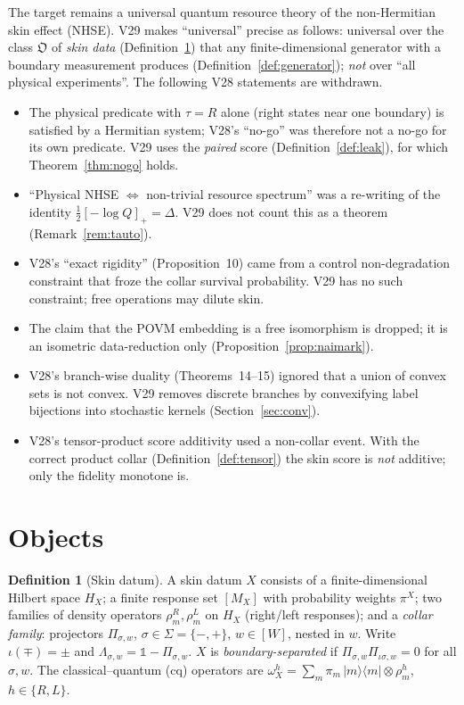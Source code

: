\documentclass[11pt]{article}
\theoremstyle{definition}
\newtheorem{definition}{Definition}
\theoremstyle{remark}
\newcommand{\one}{\mathbb{1}}
\begin{document}
The target remains a universal quantum resource theory of the non-Hermitian skin effect (NHSE). V29 makes ``universal'' precise as follows: universal over the class $\mathfrak{O}$ of \emph{skin data} (Definition~\ref{def:object}) that any finite-dimensional generator with a boundary measurement produces (Definition~\ref{def:generator}); \emph{not} over ``all physical experiments''. The following V28 statements are withdrawn.
\begin{itemize}
\item The physical predicate with $\tau=R$ alone (right states near one boundary) is satisfied by a Hermitian system; V28's ``no-go'' was therefore not a no-go for its own predicate. V29 uses the \emph{paired} score (Definition~\ref{def:leak}), for which Theorem~\ref{thm:nogo} holds.
\item ``Physical NHSE $\Leftrightarrow$ non-trivial resource spectrum'' was a re-writing of the identity $\tfrac12[-\log Q]_+=\Delta$. V29 does not count this as a theorem (Remark~\ref{rem:tauto}).
\item V28's ``exact rigidity'' (Proposition~10) came from a control non-degradation constraint that froze the collar survival probability. V29 has no such constraint; free operations may dilute skin.
\item The claim that the POVM embedding is a free isomorphism is dropped; it is an isometric data-reduction only (Proposition~\ref{prop:naimark}).
\item V28's branch-wise duality (Theorems~14--15) ignored that a union of convex sets is not convex. V29 removes discrete branches by convexifying label bijections into stochastic kernels (Section~\ref{sec:conv}).
\item V28's tensor-product score additivity used a non-collar event. With the correct product collar (Definition~\ref{def:tensor}) the skin score is \emph{not} additive; only the fidelity monotone is.
\end{itemize}

\section{Objects}
\label{sec:objects}

\begin{definition}[Skin datum]\label{def:object}
A skin datum $X$ consists of a finite-dimensional Hilbert space $H_X$; a finite response set $[M_X]$ with probability weights $\pi^X$; two families of density operators $\rho^R_m,\rho^L_m$ on $H_X$ (right/left responses); and a \emph{collar family}: projectors $\Pi_{\sigma,w}$, $\sigma\in\Sigma=\{-,+\}$, $w\in[W]$, nested in $w$. Write $\iota(\mp)=\pm$ and $\Lambda_{\sigma,w}=\one-\Pi_{\sigma,w}$. $X$ is \emph{boundary-separated} if $\Pi_{\sigma,w}\Pi_{\iota\sigma,w}=0$ for all $\sigma,w$.
The classical--quantum (cq) operators are $\omega^h_X=\sum_m\pi_m\,|m\rangle\!\langle m|\otimes\rho^h_m$, $h\in\{R,L\}$.
\end{definition}
\end{document}

